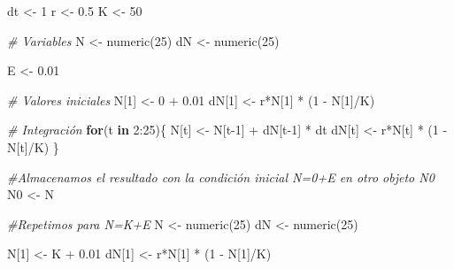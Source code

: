 \documentclass[
]{book}
\newenvironment{Shaded}{\begin{snugshade}}{\end{snugshade}}
\newcommand{\CommentTok}[1]{\textcolor[rgb]{0.56,0.35,0.01}{\textit{#1}}}
\newcommand{\ControlFlowTok}[1]{\textcolor[rgb]{0.13,0.29,0.53}{\textbf{#1}}}
\newcommand{\DecValTok}[1]{\textcolor[rgb]{0.00,0.00,0.81}{#1}}
\newcommand{\FloatTok}[1]{\textcolor[rgb]{0.00,0.00,0.81}{#1}}
\newcommand{\FunctionTok}[1]{\textcolor[rgb]{0.00,0.00,0.00}{#1}}
\newcommand{\NormalTok}[1]{#1}
\newcommand{\OtherTok}[1]{\textcolor[rgb]{0.56,0.35,0.01}{#1}}
\newcommand{\SpecialCharTok}[1]{\textcolor[rgb]{0.00,0.00,0.00}{#1}}
\begin{document}
\begin{Shaded}
\begin{Highlighting}[]
\NormalTok{dt }\OtherTok{\textless{}{-}} \DecValTok{1}
\NormalTok{r }\OtherTok{\textless{}{-}} \FloatTok{0.5}
\NormalTok{K }\OtherTok{\textless{}{-}} \DecValTok{50}

\CommentTok{\# Variables}
\NormalTok{N }\OtherTok{\textless{}{-}} \FunctionTok{numeric}\NormalTok{(}\DecValTok{25}\NormalTok{)}
\NormalTok{dN }\OtherTok{\textless{}{-}} \FunctionTok{numeric}\NormalTok{(}\DecValTok{25}\NormalTok{)}

\NormalTok{E }\OtherTok{\textless{}{-}} \FloatTok{0.01}

\CommentTok{\# Valores iniciales}
\NormalTok{N[}\DecValTok{1}\NormalTok{] }\OtherTok{\textless{}{-}} \DecValTok{0} \SpecialCharTok{+} \FloatTok{0.01}
\NormalTok{dN[}\DecValTok{1}\NormalTok{] }\OtherTok{\textless{}{-}}\NormalTok{ r}\SpecialCharTok{*}\NormalTok{N[}\DecValTok{1}\NormalTok{] }\SpecialCharTok{*}\NormalTok{ (}\DecValTok{1} \SpecialCharTok{{-}}\NormalTok{ N[}\DecValTok{1}\NormalTok{]}\SpecialCharTok{/}\NormalTok{K)}

\CommentTok{\# Integración}
\ControlFlowTok{for}\NormalTok{(t }\ControlFlowTok{in} \DecValTok{2}\SpecialCharTok{:}\DecValTok{25}\NormalTok{)\{}
\NormalTok{    N[t] }\OtherTok{\textless{}{-}}\NormalTok{ N[t}\DecValTok{{-}1}\NormalTok{] }\SpecialCharTok{+}\NormalTok{ dN[t}\DecValTok{{-}1}\NormalTok{] }\SpecialCharTok{*}\NormalTok{ dt}
\NormalTok{    dN[t] }\OtherTok{\textless{}{-}}\NormalTok{ r}\SpecialCharTok{*}\NormalTok{N[t] }\SpecialCharTok{*}\NormalTok{ (}\DecValTok{1} \SpecialCharTok{{-}}\NormalTok{ N[t]}\SpecialCharTok{/}\NormalTok{K)}
\NormalTok{\}}

\CommentTok{\#Almacenamos el resultado con la condición inicial N=0+E en otro objeto N0}
\NormalTok{N0 }\OtherTok{\textless{}{-}}\NormalTok{ N}

\CommentTok{\#Repetimos para N=K+E}
\NormalTok{N }\OtherTok{\textless{}{-}} \FunctionTok{numeric}\NormalTok{(}\DecValTok{25}\NormalTok{)}
\NormalTok{dN }\OtherTok{\textless{}{-}} \FunctionTok{numeric}\NormalTok{(}\DecValTok{25}\NormalTok{)}

\NormalTok{N[}\DecValTok{1}\NormalTok{] }\OtherTok{\textless{}{-}}\NormalTok{ K }\SpecialCharTok{+} \FloatTok{0.01}
\NormalTok{dN[}\DecValTok{1}\NormalTok{] }\OtherTok{\textless{}{-}}\NormalTok{ r}\SpecialCharTok{*}\NormalTok{N[}\DecValTok{1}\NormalTok{] }\SpecialCharTok{*}\NormalTok{ (}\DecValTok{1} \SpecialCharTok{{-}}\NormalTok{ N[}\DecValTok{1}\NormalTok{]}\SpecialCharTok{/}\NormalTok{K)}


\end{Highlighting}
\end{Shaded}
\end{document}
